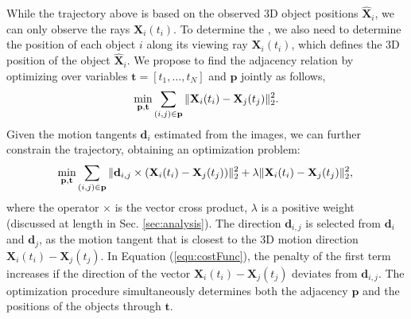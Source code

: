 While the trajectory above is based on the observed 3D object positions $\mathbf{\hat{X}}_i$, we can only observe the rays $\mathbf{X}_i(t_i)$. To determine the \oct, we also need to determine the position of each object $i$ along its viewing ray $\mathbf{X}_i(t_i)$, which defines the 3D position of the object $\mathbf{\hat{X}}_i$.
We propose to find the adjacency relation by optimizing over variables $\mathbf{t}=[ t_1, \dots, t_N ]$ and $\mathbf{p}$ jointly as follows,
\begin{equation}
\label{eq:pathsimpleray}
\underset{\mathbf{p},\mathbf{t}} { \text{min} }\sum_{(i,j)\in\mathbf{p}}{\|\mathbf{X}_i(t_i)-\mathbf{X}_j(t_j)\|_2^2}. \\
\end{equation}
Given the motion tangents $\mathbf d_i$ estimated from the images, we can further constrain the trajectory, obtaining an optimization problem:
\begin{equation}
\label{equ:costFunc}
\underset{\mathbf{p},\mathbf{t}} { \text{min} }
\sum_{(i,j)\in\mathbf{p}}{\|\mathbf{d}_{i,j}\times(\mathbf{X}_i(t_i)-\mathbf{X}_j(t_j))\|_2^2 + \lambda\|\mathbf{X}_i(t_i)-\mathbf{X}_j(t_j)\|_2^2}, \\
\end{equation}
where the operator $\times$ is the vector cross product, $\lambda$ is a positive weight (discussed at length in Sec. \ref{sec:analysis}). The direction $\mathbf{d}_{i,j}$ is selected from $\mathbf{d}_i$ and $\mathbf{d}_j$, as the motion tangent that is closest to the 3D motion direction $\mathbf{X}_i(t_i)-\mathbf{X}_j(t_j)$.
In Equation (\ref{equ:costFunc}), the penalty of the first term increases if the direction of the vector $\mathbf{X}_i(t_i)-\mathbf{X}_j(t_j)$ deviates from $\mathbf{d}_{i,j}$.
The optimization procedure simultaneously determines both the adjacency $\mathbf{p}$ and the positions of the objects through $\mathbf{t}$.

